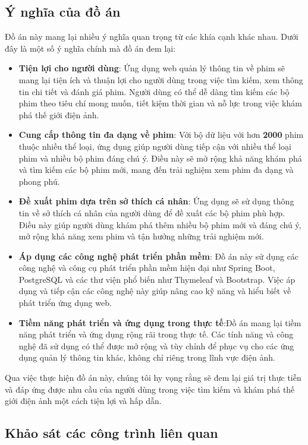 \documentclass[12pt]{article}
\begin{document}
\subsection{Ý nghĩa của đồ án}
Đồ án này mang lại nhiều ý nghĩa quan trọng từ các khía cạnh khác nhau. Dưới đây là một số ý nghĩa chính mà đồ án đem lại:
\begin{itemize}
    \item \textbf{Tiện lợi cho người dùng}: Ứng dụng web quản lý thông tin về phim sẽ mang lại tiện ích và thuận lợi cho người dùng trong việc tìm kiếm, xem thông tin chi tiết và đánh giá phim. Người dùng có thể dễ dàng tìm kiếm các bộ phim theo tiêu chí mong muốn, tiết kiệm thời gian và nỗ lực trong việc khám phá thế giới điện ảnh.
    \item \textbf{Cung cấp thông tin đa dạng về phim}: Với bộ dữ liệu với hơn \textbf{2000} phim thuộc nhiều thể loại, ứng dụng giúp người dùng tiếp cận với nhiều thể loại phim và nhiều bộ phim đáng chú ý. Điều này sẽ mở rộng khả năng khám phá và tìm kiếm các bộ phim mới, mang đến trải nghiệm xem phim đa dạng và phong phú.
    \item \textbf{Đề xuất phim dựa trên sở thích cá nhân}:  Ứng dụng sẽ sử dụng thông tin về sở thích cá nhân của người dùng để đề xuất các bộ phim phù hợp. Điều này giúp người dùng khám phá thêm nhiều bộ phim mới và đáng chú ý, mở rộng khả năng xem phim và tận hưởng những trải nghiệm mới.
    \item \textbf{Áp dụng các công nghệ phát triển phần mềm}: Đồ án này sử dụng các công nghệ và công cụ phát triển phần mềm hiện đại như Spring Boot, PostgreSQL và các thư viện phổ biến như Thymeleaf và Bootstrap. Việc áp dụng và tiếp cận các công nghệ này giúp nâng cao kỹ năng và hiểu biết về phát triển ứng dụng web.
    \item \textbf{Tiềm năng phát triển và ứng dụng trong thực tế}:Đồ án mang lại tiềm năng phát triển và ứng dụng rộng rãi trong thực tế. Các tính năng và công nghệ đã sử dụng có thể được mở rộng và tùy chỉnh để phục vụ cho các ứng dụng quản lý thông tin khác, không chỉ riêng trong lĩnh vực điện ảnh.
\end{itemize}
Qua việc thực hiện đồ án này, chúng tôi hy vọng rằng sẽ đem lại giá trị thực tiễn và đáp ứng được nhu cầu của người dùng trong việc tìm kiếm và khám phá thế giới điện ảnh một cách tiện lợi và hấp dẫn.


\subsection{ Khảo sát các công trình liên quan}
\end{document}
